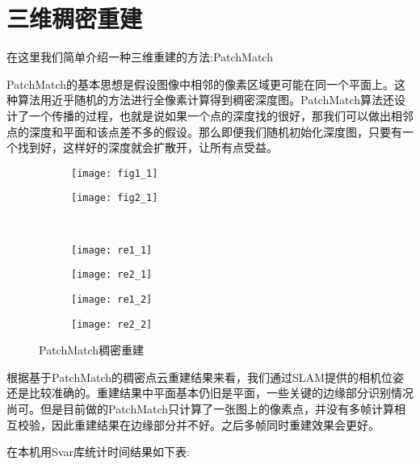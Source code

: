 \section{三维稠密重建}
在这里我们简单介绍一种三维重建的方法:PatchMatch\par
PatchMatch的基本思想是假设图像中相邻的像素区域更可能在同一个平面上。这种算法用近乎随机的方法进行全像素计算得到稠密深度图。PatchMatch算法还设计了一个传播的过程，也就是说如果一个点的深度找的很好，那我们可以做出相邻点的深度和平面和该点差不多的假设。那么即便我们随机初始化深度图，只要有一个找到好，这样好的深度就会扩散开，让所有点受益。
\begin{figure}[H]
	\centering
	\begin{subfigure}[ht]{0.4\textwidth}
		\centering
		\texttt{[image: fig1\_1]}
	\end{subfigure}
	\quad
	\begin{subfigure}[ht]{0.4\textwidth}
		\centering
		\texttt{[image: fig2\_1]}
	\end{subfigure}\\
	\begin{subfigure}[ht]{0.4\textwidth}
		\centering
		\texttt{[image: re1\_1]}
	\end{subfigure}
	\quad
	\begin{subfigure}[ht]{0.4\textwidth}
		\centering
		\texttt{[image: re2\_1]}
	\end{subfigure}
\begin{subfigure}[ht]{0.4\textwidth}
	\centering
	\texttt{[image: re1\_2]}
\end{subfigure}
\quad
\begin{subfigure}[ht]{0.4\textwidth}
	\centering
	\texttt{[image: re2\_2]}
\end{subfigure}
	\caption{PatchMatch稠密重建}
\end{figure}
根据基于PatchMatch的稠密点云重建结果来看，我们通过SLAM提供的相机位姿还是比较准确的。重建结果中平面基本仍旧是平面，一些关键的边缘部分识别情况尚可。但是目前做的PatchMatch只计算了一张图上的像素点，并没有多帧计算相互校验，因此重建结果在边缘部分并不好。之后多帧同时重建效果会更好。\par
在本机用Svar库统计时间结果如下表:
